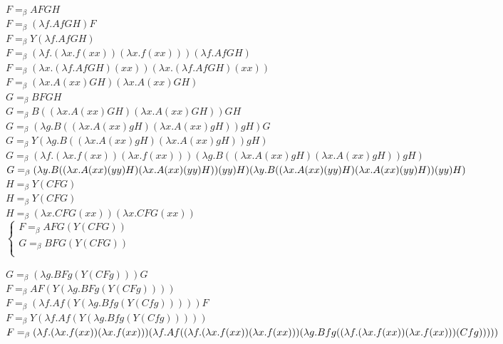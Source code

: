 \documentclass[fontsize=14pt, paper=a4, pagesize, DIV=calc]{article}
\begin{document}
\begin{enumerate}
$F =_{\beta} A F G H$\\
$F =_{\beta} (\lambda f . A f G H) F$\\
$F =_{\beta} Y (\lambda f . A f G H)$\\
$F =_{\beta} (\lambda f . (\lambda x . f (x x)) (\lambda x . f (x x))) (\lambda f . A f G H)$\\
$F =_{\beta} (\lambda x . (\lambda f . A f G H) (x x)) (\lambda x . (\lambda f . A f G H) (x x)) $\\
$F =_{\beta} (\lambda x . A (x x) G H) (\lambda x . A (x x) G H) $\\

$G =_{\beta} B F G H$\\
$G =_{\beta} B ((\lambda x . A (x x) G H) (\lambda x . A (x x) G H)) G H$\\
$G =_{\beta} (\lambda g . B ((\lambda x . A (x x) g H) (\lambda x . A (x x) g H)) g H) G$\\
$G =_{\beta} Y (\lambda g . B ((\lambda x . A (x x) g H) (\lambda x . A (x x) g H)) g H)$\\
$G =_{\beta} (\lambda f . (\lambda x . f (x x)) (\lambda x . f (x x))) (\lambda g . B ((\lambda x . A (x x) g H) (\lambda x . A (x x) g H)) g H)$\\
$G =_{\beta} (\lambda y . B ((\lambda x . A (x x) (y y) H) (\lambda x . A (x x) (y y) H)) (y y) H)\\ 
(\lambda y . B ((\lambda x . A (x x) (y y) H) (\lambda x . A (x x) (y y) H)) (y y) H) $\\

$H =_{\beta} Y (C F G)$\\
$H =_{\beta} Y (C F G)$\\
$H =_{\beta} (\lambda x . C F G (x x)) (\lambda x . C F G (x x))$\\

$
\begin{cases} 
    F =_{\beta} A F G (Y (C F G)) \\ 
    G =_{\beta} B F G (Y (C F G)) \\ 
\end{cases}
$

$G =_{\beta} (\lambda g . B F g (Y (C F g))) G$\\

$F =_{\beta} A F (Y (\lambda g . B F g (Y (C F g))))$\\
$F =_{\beta} (\lambda f . A f (Y (\lambda g . B f g (Y (C f g))))) F$\\
$F =_{\beta} Y (\lambda f . A f (Y (\lambda g . B f g (Y (C f g)))))$\\
$F =_{\beta} (\lambda f . (\lambda x . f (x x)) (\lambda x . f (x x))) \\
(\lambda f . A f ((\lambda f . (\lambda x . f (x x)) (\lambda x . f (x x))) \\
(\lambda g . B f g ((\lambda f . (\lambda x . f (x x)) (\lambda x . f (x x))) (C f g)))))$\\


\end{enumerate}
\end{document}
